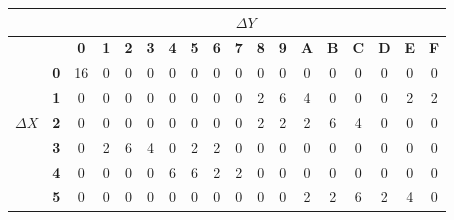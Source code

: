 \documentclass[fleqn]{article}
\begin{document}
\begin{table}[H]
\captionsetup{labelfont=bf}
\begin{tabular}{c|c|c|c|c|c|c|c|c|c|c|c|c|c|c|c|c|c|}
\cline{2-18}
                                                            & \multicolumn{17}{c|}{\textbf{$\Delta Y$}}                                                                                                                                                                                  \\ \hline
\multicolumn{1}{|c|}{\multirow{17}{*}{\textbf{$\Delta X$}}} & \textbf{}  & \textbf{0} & \textbf{1} & \textbf{2} & \textbf{3} & \textbf{4} & \textbf{5} & \textbf{6} & \textbf{7} & \textbf{8} & \textbf{9} & \textbf{A} & \textbf{B} & \textbf{C} & \textbf{D} & \textbf{E} & \textbf{F} \\ \cline{2-18} 
\multicolumn{1}{|c|}{}                                      & \textbf{0} & 16         & 0          & 0          & 0          & 0          & 0          & 0          & 0          & 0          & 0          & 0          & 0          & 0          & 0          & 0          & 0          \\ \cline{2-18} 
\multicolumn{1}{|c|}{}                                      & \textbf{1} & 0          & 0          & 0          & 0          & 0          & 0          & 0          & 0          & 2          & 6          & 4          & 0          & 0          & 0          & 2          & 2          \\ \cline{2-18} 
\multicolumn{1}{|c|}{}                                      & \textbf{2} & 0          & 0          & 0          & 0          & 0          & 0          & 0          & 0          & 2          & 2          & 2          & 6          & 4          & 0          & 0          & 0          \\ \cline{2-18} 
\multicolumn{1}{|c|}{}                                      & \textbf{3} & 0          & 2          & 6          & 4          & 0          & 2          & 2          & 0          & 0          & 0          & 0          & 0          & 0          & 0          & 0          & 0          \\ \cline{2-18} 
\multicolumn{1}{|c|}{}                                      & \textbf{4} & 0          & 0          & 0          & 0          & 6          & 6          & 2          & 2          & 0          & 0          & 0          & 0          & 0          & 0          & 0          & 0          \\ \cline{2-18} 
\multicolumn{1}{|c|}{}                                      & \textbf{5} & 0          & 0          & 0          & 0          & 0          & 0          & 0          & 0          & 0          & 0          & 2          & 2          & 6          & 2          & 4          & 0          \\ \cline{2-18} 

\end{tabular}
\end{table}
\end{document}

